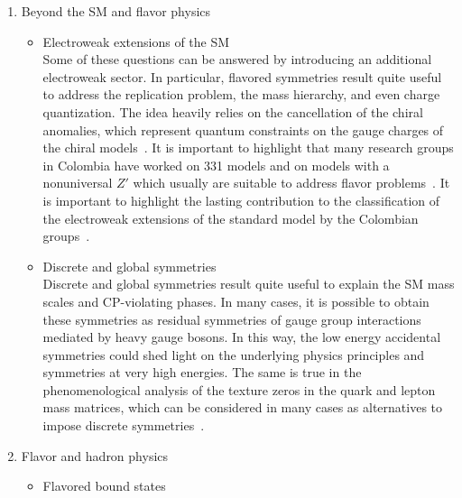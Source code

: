 \documentclass[a4paper,11pt]{article}
\begin{document}
\begin{enumerate}
\item 
Beyond the SM and flavor physics
\begin{itemize}
\item 
Electroweak extensions of the SM\\
Some of these questions can be answered by introducing an additional electroweak sector. In particular, flavored symmetries result quite useful to address the replication problem, the mass hierarchy, and even charge quantization. The idea heavily relies on the cancellation of the chiral anomalies, which represent quantum constraints on the gauge charges of the chiral models~\cite{Berenstein:2008xg, Martinez:2013qya, Martinez:2014lta, Martinez:2015kmn, Mantilla:2016sew, Mantilla:2016lui, Martinez:2017ize}.  It is important to highlight that many research groups in Colombia have worked on 331 models and on models with a nonuniversal $Z'$ which usually are suitable to address flavor problems~\cite{Diaz:2003dk, Diaz:2004fs, Ochoa:2005ch, CarcamoHernandez:2005ka, Martinez:2006gb, Martinez:2008jj, Martinez:2009ik, Catano:2012kw, Alvarado:2012xi, Martinez:2012ni, Hernandez:2013mcf, Hernandez:2013hea, Benavides:2018rgh, Benavides:2018fzm, Rodriguez:2016cgr,Salazar:2015gxa}. 
It is important to highlight the lasting contribution to  the classification of the electroweak extensions of the standard model by the Colombian  groups~\cite{Ponce:2002sg, Diaz:2004fs, Rojas:2015tqa, Benavides:2016utf, Benavides:2018fzm}.
%
\item
Discrete and global symmetries\\
Discrete and global symmetries result quite useful to explain the SM mass scales and CP-violating phases.  In many cases, it is possible to obtain these symmetries as residual symmetries of gauge group interactions mediated by heavy gauge bosons. In this way, the low energy accidental symmetries could shed light on the underlying physics principles and symmetries at very high energies.  The same is true in the phenomenological analysis of the texture zeros in the quark and lepton mass matrices, which can be considered in many cases as alternatives to impose discrete symmetries~\cite{Giraldo:2011ya, Hernandez:2014vta, Hernandez:2014lpa, Hernandez:2015tna, Hernandez:2015cra, Benavides:2020pjx}. 
\end{itemize}
%
\item
Flavor and hadron physics
\begin{itemize}
\item 
Flavored bound states\\

\end{itemize}
\end{enumerate}
\end{document}
